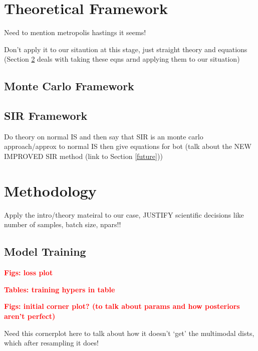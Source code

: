 \documentclass[aps,superscriptaddress,twocolumn,nopreprintnumbers,floatfix,groupedaddress]{revtex4-1}
\begin{document}
\section{Theoretical Framework}\label{theory}

Need to mention metropolis hastings it seems!

Don't apply it to our sitaution at this stage, just straight theory and equations (Section \ref{methods} deals with taking these eqns arnd applying them to our situation)

\subsection{Monte Carlo Framework}\label{theory:monte}

\subsection{SIR Framework}\label{theory:sir}

Do theory on normal IS and then say that SIR is an monte carlo approach/approx to normal IS then give equations for bot (talk about the NEW IMPROVED SIR method (link to Section \ref{future}))

%

\section{Methodology}\label{methods}

Apply the intro/theory mateiral to our case, JUSTIFY scientific decisions like number of samples, batch size, npars!!

\subsection{Model Training}
\textbf{\textcolor{red}{Figs: loss plot}}

\textbf{\textcolor{red}{Tables: training hypers in table}}

\textbf{\textcolor{red}{Figs: initial corner plot? (to talk about params and how posteriors aren't perfect)}}

Need this cornerplot here to talk about how it doesn't `get' the multimodal dists, which after resampling it does!
\end{document}
